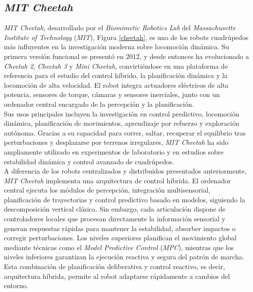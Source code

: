 \subsection{\textit{MIT Cheetah}}
\textit{MIT Cheetah}, desarrollado por el \textit{Biomimetic Robotics Lab} del 
\textit{Massachusetts Institute of Technology} (\textit{MIT}), 
Figura \ref{cheetah}, es uno de los robots cuadrúpedos más influyentes en la investigación moderna 
sobre locomoción dinámica. Su primera versión funcional se presentó en 2012, y desde entonces ha 
evolucionado a \textit{Cheetah 2}, \textit{Cheetah 3} y \textit{Mini Cheetah}, convirtiéndose 
en una plataforma de referencia para el estudio del control híbrido, la planificación dinámica 
y la locomoción de alta velocidad. El robot integra actuadores eléctricos de alta potencia, 
sensores de torque, cámaras y sensores inerciales, junto con un ordenador central encargado de 
la percepción y la planificación. \\

Sus usos principales incluyen la investigación en control predictivo, locomoción dinámica, 
planificación de movimientos, aprendizaje por refuerzo y exploración autónoma. Gracias a su 
capacidad para correr, saltar, recuperar el equilibrio tras perturbaciones y desplazarse por 
terrenos irregulares, \textit{MIT Cheetah} ha sido ampliamente utilizado en experimentos de 
laboratorio y en estudios sobre estabilidad dinámica y control avanzado de cuadrúpedos. \\

A diferencia de los robots centralizados y distribuidos presentados anteriormente, 
\textit{MIT Cheetah} implementa una arquitectura de 
control híbrida. El ordenador central ejecuta los módulos de percepción, integración multisensorial,
planificación de trayectorias y control predictivo basado en modelos, siguiendo la descomposición 
vertical clásica. Sin embargo, cada articulación dispone de controladores locales que procesan 
directamente la información sensorial y generan respuestas rápidas para mantener la estabilidad, 
absorber impactos o corregir perturbaciones. Los niveles superiores planifican el movimiento global
mediante técnicas 
como el \textit{Model Predictive Control} (\textit{MPC}), mientras que los niveles inferiores garantizan la 
ejecución reactiva y segura del patrón de marcha. Esta combinación de planificación deliberativa 
y control reactivo, es decir, arquitectura híbrida, permite al robot adaptarse rápidamente a 
cambios del entorno. \\

